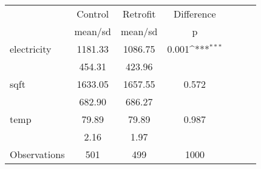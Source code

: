 {
\def\sym#1{\ifmmode^{#1}\else\(^{#1}\)\fi}
\begin{tabular}{l*{3}{cc}}
\hline\hline
                    &\multicolumn{1}{c}{Control}&\multicolumn{1}{c}{Retrofit}&\multicolumn{1}{c}{Difference}\\
                    &     mean/sd&     mean/sd&           p         \\
\hline
electricity         &     1181.33&     1086.75&       0.001\sym{***}\\
                    &      454.31&      423.96&                     \\
sqft                &     1633.05&     1657.55&       0.572         \\
                    &      682.90&      686.27&                     \\
temp                &       79.89&       79.89&       0.987         \\
                    &        2.16&        1.97&                     \\
\hline
Observations        &         501&         499&        1000         \\
\hline\hline
\end{tabular}
}
